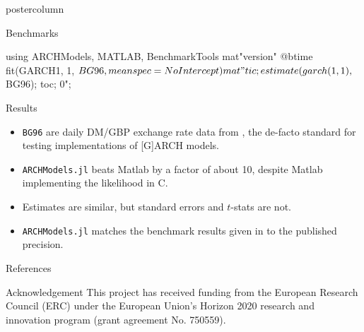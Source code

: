 \documentclass{beamer}
\begin{document}
\begin{frame}[fragile]
\begin{columns}
\begin{column}{.48\textwidth}
\begin{beamercolorbox}[center]{postercolumn}
\begin{myblock}{Benchmarks}
{\footnotesize
\begin{juliaconsole}
using ARCHModels, MATLAB, BenchmarkTools
mat"version"
@btime fit(GARCH{1, 1}, $BG96, meanspec=NoIntercept)
mat"tic; estimate(garch(1, 1), $BG96); toc; 0";
\end{juliaconsole}
}
\end{myblock}\vfill


\begin{myblock}{Results}
\begin{itemize}
\item \texttt{BG96} are daily DM/GBP exchange rate data from \citet{bg:96}, the de-facto standard for testing implementations of [G]ARCH models.
\item \texttt{ARCHModels.jl} beats Matlab by a {\color{red} factor of about 10}, despite Matlab implementing the likelihood {\color{red}in C}.
\item Estimates are similar, but standard errors and $t$-stats are not.
\item \texttt{ARCHModels.jl} {\color{red}matches} the benchmark results given in \citet{bbp:01} to the published precision.
\end{itemize}
\end{myblock}
\begin{myblock}{References}
\footnotesize


\end{myblock}\vfill
\begin{myblock}{Acknowledgement}
This project has received funding from the European Research Council (ERC) under the European Union's Horizon 2020 research and innovation  program (grant agreement No. 750559).
\end{myblock}\vfill
\end{beamercolorbox}
\end{column}
\end{columns}
\end{frame}
\end{document}
